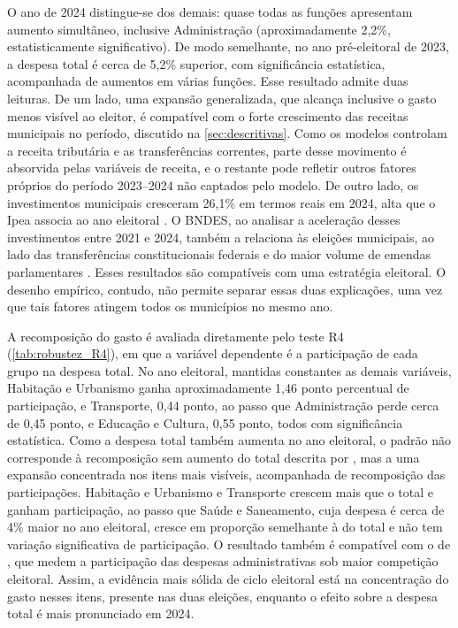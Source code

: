 O ano de 2024 distingue-se dos demais: quase todas as funções apresentam aumento simultâneo, inclusive Administração (aproximadamente 2,2\%, estatisticamente significativo). De modo semelhante, no ano pré-eleitoral de 2023, a despesa total é cerca de 5,2\% superior, com significância estatística, acompanhada de aumentos em várias funções. Esse resultado admite duas leituras. De um lado, uma expansão generalizada, que alcança inclusive o gasto menos visível ao eleitor, é compatível com o forte crescimento das receitas municipais no período, discutido na \autoref{sec:descritivas}. Como os modelos controlam a receita tributária e as transferências correntes, parte desse movimento é absorvida pelas variáveis de receita, e o restante pode refletir outros fatores próprios do período 2023--2024 não captados pelo modelo. De outro lado, os investimentos municipais cresceram 26,1\% em termos reais em 2024, alta que o Ipea associa ao ano eleitoral \parencite[p.~10]{santana2025}. O BNDES, ao analisar a aceleração desses investimentos entre 2021 e 2024, também a relaciona às eleições municipais, ao lado das transferências constitucionais federais e do maior volume de emendas parlamentares \parencite[p.~121]{bndes2025}. Esses resultados são compatíveis com uma estratégia eleitoral. O desenho empírico, contudo, não permite separar essas duas explicações, uma vez que tais fatores atingem todos os municípios no mesmo ano.

A recomposição do gasto é avaliada diretamente pelo teste R4 (\autoref{tab:robustez_R4}), em que a variável dependente é a participação de cada grupo na despesa total. No ano eleitoral, mantidas constantes as demais variáveis, Habitação e Urbanismo ganha aproximadamente 1,46 ponto percentual de participação, e Transporte, 0,44 ponto, ao passo que Administração perde cerca de 0,45 ponto, e Educação e Cultura, 0,55 ponto, todos com significância estatística. Como a despesa total também aumenta no ano eleitoral, o padrão não corresponde à recomposição sem aumento do total descrita por \textcite{drazen2010}, mas a uma expansão concentrada nos itens mais visíveis, acompanhada de recomposição das participações. Habitação e Urbanismo e Transporte crescem mais que o total e ganham participação, ao passo que Saúde e Saneamento, cuja despesa é cerca de 4\% maior no ano eleitoral, cresce em proporção semelhante à do total e não tem variação significativa de participação. O resultado também é compatível com o de \textcite{teixeira2021}, que medem a participação das despesas administrativas sob maior competição eleitoral. Assim, a evidência mais sólida de ciclo eleitoral está na concentração do gasto nesses itens, presente nas duas eleições, enquanto o efeito sobre a despesa total é mais pronunciado em 2024.


